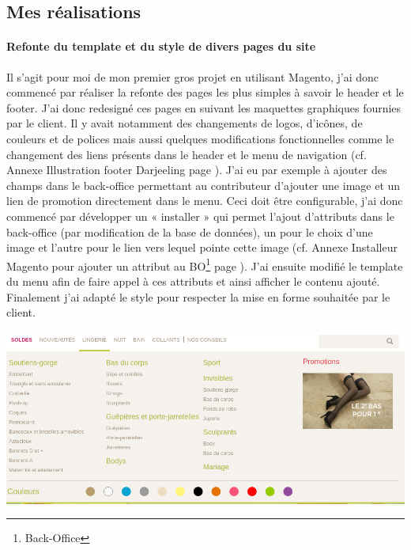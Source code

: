 \documentclass[a4paper,11pt,twoside]{report}
\begin{document}
    \subsection*{Mes réalisations}
    	\paragraph*{Refonte du template et du style de divers pages du site}
	Il s'agit pour moi de mon premier gros projet en utilisant Magento, j'ai donc commencé par réaliser la refonte des pages les plus simples à savoir le header et le footer. J'ai donc redesigné ces pages en suivant les maquettes graphiques fournies par le client. Il y avait notamment des changements de logos, d'icônes, de couleurs et de polices mais aussi quelques modifications fonctionnelles comme le changement des liens présents dans le header et le menu de navigation (cf. Annexe Illustration footer Darjeeling page \pageref{darjeeling_header}). 
	J'ai eu par exemple à ajouter des champs dans le back-office permettant au contributeur d'ajouter une image et un lien de promotion directement dans le menu. Ceci doit être configurable, j'ai donc commencé par développer un « installer » qui permet l'ajout d'attributs dans le back-office (par modification de la base de données), un pour le choix d'une image et l'autre pour le lien vers lequel pointe cette image (cf. Annexe Installeur Magento pour ajouter un attribut au BO\footnote{Back-Office} page \pageref{installeur_Magento_pour_ajouter_un_attribut_au_BO}). J'ai ensuite modifié le template du menu afin de faire appel à ces attributs et ainsi afficher le contenu ajouté. Finalement j'ai adapté le style pour respecter la mise en forme souhaitée par le client. 
	
	\begin{center}
	  \includegraphics[width=\textwidth]{images/darjeeling_nav_menu.png} 
	  \label{darjeeling_nav_menu}
	\end{center}
	
\end{document}
